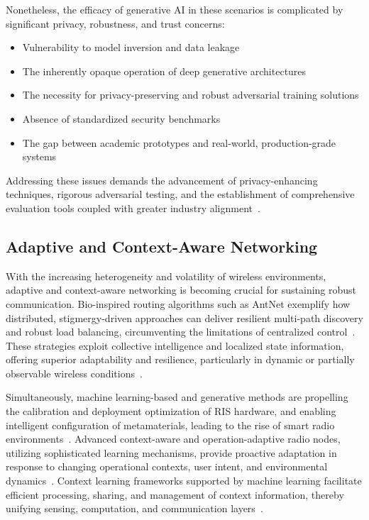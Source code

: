 \documentclass[sigconf]{acmart}
\begin{document}
Nonetheless, the efficacy of generative AI in these scenarios is complicated by significant privacy, robustness, and trust concerns:
\begin{itemize}
    \item Vulnerability to model inversion and data leakage
    \item The inherently opaque operation of deep generative architectures
    \item The necessity for privacy-preserving and robust adversarial training solutions
    \item Absence of standardized security benchmarks
    \item The gap between academic prototypes and real-world, production-grade systems
\end{itemize}
Addressing these issues demands the advancement of privacy-enhancing techniques, rigorous adversarial testing, and the establishment of comprehensive evaluation tools coupled with greater industry alignment~\cite{ref46,ref49}.

\subsection{Adaptive and Context-Aware Networking}

With the increasing heterogeneity and volatility of wireless environments, adaptive and context-aware networking is becoming crucial for sustaining robust communication. Bio-inspired routing algorithms such as AntNet exemplify how distributed, stigmergy-driven approaches can deliver resilient multi-path discovery and robust load balancing, circumventing the limitations of centralized control~\cite{ref30}. These strategies exploit collective intelligence and localized state information, offering superior adaptability and resilience, particularly in dynamic or partially observable wireless conditions~\cite{ref30}.

Simultaneously, machine learning-based and generative methods are propelling the calibration and deployment optimization of RIS hardware, and enabling intelligent configuration of metamaterials, leading to the rise of smart radio environments~\cite{ref27,ref39}. Advanced context-aware and operation-adaptive radio nodes, utilizing sophisticated learning mechanisms, provide proactive adaptation in response to changing operational contexts, user intent, and environmental dynamics~\cite{ref28}. Context learning frameworks supported by machine learning facilitate efficient processing, sharing, and management of context information, thereby unifying sensing, computation, and communication layers~\cite{ref28,ref30}.
\end{document}
